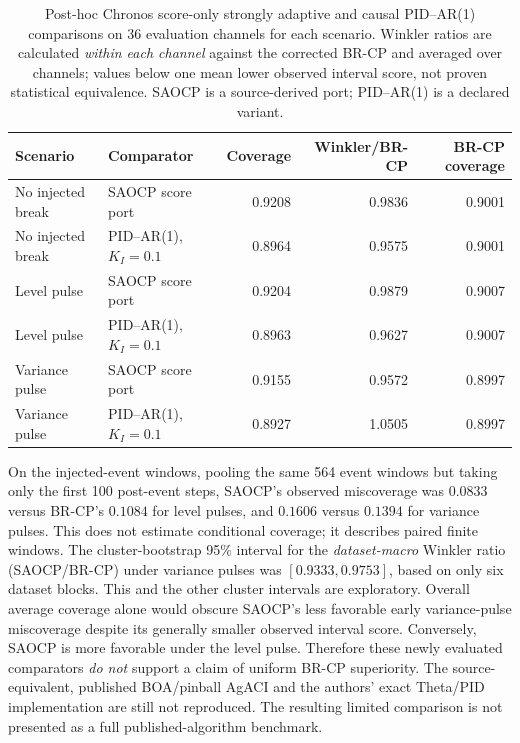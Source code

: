 \documentclass[10pt]{article}
\begin{document}
\begin{table}[ht]
\centering
\footnotesize
\caption{Post-hoc Chronos score-only strongly adaptive and causal
PID--AR(1) comparisons on 36 evaluation channels for each scenario.
Winkler ratios are calculated \emph{within each channel} against the
corrected BR-CP and averaged over channels; values below one mean
lower observed interval score, not proven statistical equivalence.
SAOCP is a source-derived port; PID--AR(1) is a declared variant.}
\label{tab:posthoc_extra_comparators}
\begin{tabular}{llrrr}
\toprule
Scenario & Comparator & Coverage & Winkler/BR-CP & BR-CP coverage \\
\midrule
No injected break & SAOCP score port & 0.9208 & 0.9836 & 0.9001 \\
No injected break & PID--AR(1), $K_I=0.1$ & 0.8964 & 0.9575 & 0.9001 \\
Level pulse & SAOCP score port & 0.9204 & 0.9879 & 0.9007 \\
Level pulse & PID--AR(1), $K_I=0.1$ & 0.8963 & 0.9627 & 0.9007 \\
Variance pulse & SAOCP score port & 0.9155 & 0.9572 & 0.8997 \\
Variance pulse & PID--AR(1), $K_I=0.1$ & 0.8927 & 1.0505 & 0.8997 \\
\bottomrule
\end{tabular}
\end{table}

On the injected-event windows, pooling the same 564 event windows
but taking only the first 100 post-event steps, SAOCP's observed
miscoverage was $0.0833$ versus BR-CP's $0.1084$ for level pulses,
and $0.1606$ versus $0.1394$ for variance pulses. This does not
estimate conditional coverage; it describes paired finite windows.
The cluster-bootstrap 95\% interval for the \emph{dataset-macro}
Winkler ratio (SAOCP/BR-CP) under variance pulses was
$[0.9333,0.9753]$, based on only six dataset blocks. This and the
other cluster intervals are exploratory. Overall average coverage
alone would obscure SAOCP's less favorable early variance-pulse
miscoverage despite its generally smaller observed interval score.
Conversely, SAOCP is more favorable under the level pulse.
Therefore these newly evaluated comparators \emph{do not} support a
claim of uniform BR-CP superiority. The source-equivalent, published
BOA/pinball AgACI and the authors' exact Theta/PID implementation
are still not reproduced. The resulting limited comparison is not
presented as a full published-algorithm benchmark.
\end{document}
